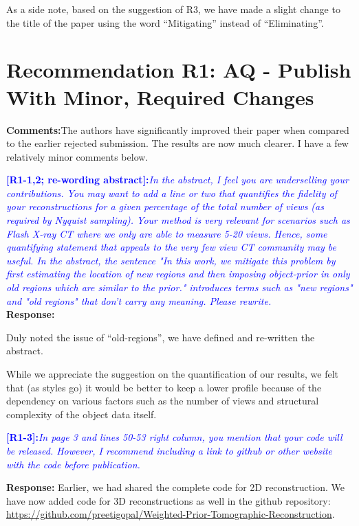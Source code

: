 \documentclass{article}
\begin{document}
As a side note, based on the suggestion of R3, we have made a
slight change to the title of the paper using the word ``Mitigating''
instead of ``Eliminating''.  
  
  \section{Recommendation R1: AQ - Publish With Minor, Required
    Changes} 

  \textbf{Comments:}The authors have significantly improved their
  paper when compared to the earlier rejected submission. The results
  are now much clearer. I have a few relatively minor comments below. 

  \textcolor{blue}{\textbf{[R1-1,2; re-wording abstract]:}\textit{In
      the abstract, I feel you are underselling your
      contributions. You may want to add a line or two that quantifies
      the fidelity of your reconstructions for a given percentage of
      the total number of views (as required by Nyquist
      sampling). Your method is very relevant for scenarios such as
      Flash X-ray CT where we only are able to measure 5-20
      views. Hence, some quantifying statement that appeals to the
      very few view CT community may be useful. In the abstract, the
      sentence "In this work, we mitigate this problem by first
      estimating the location of new regions and then imposing
      object-prior in only old regions which are similar to the
      prior." introduces terms such as "new regions" and "old regions"
      that don't carry any meaning. Please rewrite.}}\\ 

  \textbf{Response:}

  Duly noted the issue of ``old-regions'', we have defined and
  re-written the  abstract. 

  While we appreciate the suggestion on the quantification of our
  results, we felt that (as styles go) it would be better to keep a
  lower profile because of the dependency on various factors such as
  the number of views and structural complexity of the object data
  itself.


  \textcolor{blue}{\textbf{[R1-3]:}\textit{In page 3 and lines 50-53
      right column, you mention that your code will be
      released. However, I recommend including a link to github or
      other website with the code before publication.}} 

  \textbf{Response:} Earlier, we had shared the complete code for 2D
  reconstruction. We have now added code for 3D reconstructions as
  well in the github repository:
  \url{https://github.com/preetigopal/Weighted-Prior-Tomographic-Reconstruction}.
\end{document}

